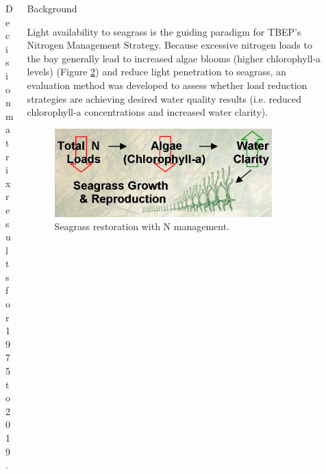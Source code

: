 \documentclass[final,t]{beamer}\usepackage[]{graphicx}\usepackage[]{color}
\begin{document}
\begin{frame}
\begin{columns}[t]
\begin{column}{.2\linewidth}
\begin{figure}
\caption{\footnotesize Decision matrix results for 1975 to 2019.}
\label{fig:attainmat}
\end{figure}

\end{column}

\begin{column}{.79\linewidth}

\begin{block}{Background}
\begin{minipage}{0.5\textwidth}
\vspace{-0.2in}
\footnotesize
Light availability to seagrass is the guiding paradigm for TBEP's Nitrogen Management Strategy. Because excessive nitrogen loads to the bay generally lead to increased algae blooms (higher chlorophyll-a levels) (Figure \ref{fig:nitro}) and reduce light penetration to seagrass, an evaluation method was developed to assess whether load reduction strategies are achieving desired water quality results (i.e. reduced chlorophyll-a concentrations and increased water clarity).
\end{minipage}
\hspace{0.1in}
\begin{minipage}{0.45\textwidth}
\begin{figure}
\includegraphics[width=0.9\textwidth]{www/nitro.PNG}
\caption{\footnotesize Seagrass restoration with N management.}
\label{fig:nitro}
\end{figure}
\end{minipage}
\vspace{-0.2in}
\end{block}


\end{column}
\end{columns}
\end{frame}
\end{document}
